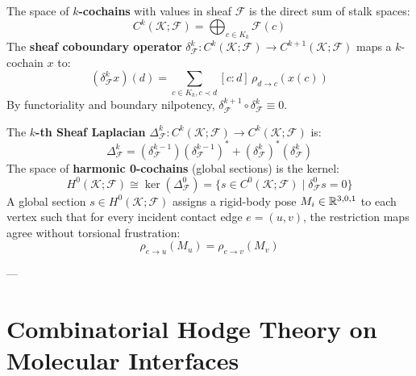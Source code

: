\begin{definition}
The space of \textbf{$k$-cochains} with values in sheaf $\mathcal{F}$ is the direct sum of stalk spaces:
\begin{equation}
    C^k(\mathcal{K}; \mathcal{F}) = \bigoplus_{c \in K_k} \mathcal{F}(c)
\end{equation}
The \textbf{sheaf coboundary operator} $\delta_{\mathcal{F}}^k : C^k(\mathcal{K}; \mathcal{F}) \to C^{k+1}(\mathcal{K}; \mathcal{F})$ maps a $k$-cochain $x$ to:
\begin{equation}
    (\delta_{\mathcal{F}}^k x)(d) = \sum_{c \in K_k, c \prec d} [c : d] \, \rho_{d \to c}(x(c))
\end{equation}
By functoriality and boundary nilpotency, $\delta_{\mathcal{F}}^{k+1} \circ \delta_{\mathcal{F}}^k \equiv 0$.
\end{definition}

\begin{definition}
The \textbf{$k$-th Sheaf Laplacian} $\Delta_{\mathcal{F}}^k : C^k(\mathcal{K}; \mathcal{F}) \to C^k(\mathcal{K}; \mathcal{F})$ is:
\begin{equation}
    \Delta_{\mathcal{F}}^k = (\delta_{\mathcal{F}}^{k-1}) (\delta_{\mathcal{F}}^{k-1})^* + (\delta_{\mathcal{F}}^k)^* (\delta_{\mathcal{F}}^k)
\end{equation}
The space of \textbf{harmonic 0-cochains} (global sections) is the kernel:
\begin{equation}
    H^0(\mathcal{K}; \mathcal{F}) \cong \ker(\Delta_{\mathcal{F}}^0) = \{ s \in C^0(\mathcal{K}; \mathcal{F}) \mid \delta_{\mathcal{F}}^0 s = 0 \}
\end{equation}
A global section $s \in H^0(\mathcal{K}; \mathcal{F})$ assigns a rigid-body pose $M_i \in \mathbb{R}^{3,0,1}$ to each vertex such that for every incident contact edge $e = (u, v)$, the restriction maps agree without torsional frustration:
\begin{equation}
    \rho_{e \to u}(M_u) = \rho_{e \to v}(M_v)
\end{equation}
\end{definition}

---

\section{Combinatorial Hodge Theory on Molecular Interfaces}
\label{sec:combinatorial_hodge_theory}

